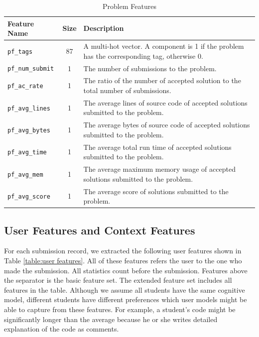         \begin{table}[hpbt]
        \begin{adjustwidth}{-1.5cm}{-1.5cm}
        \centering
        \begin{tabular}{lcp{12.5cm}}
            \hline
            Feature Name & Size & Description \\
            \hline
            {\footnotesize\verb|pf_tags|} & 87 &
                A multi-hot vector.\newline
                A component is 1 if the problem has the corresponding tag, otherwise 0. \\
            {\footnotesize\verb|pf_num_submit|} & 1 &
                The number of submissions to the problem. \\
            {\footnotesize\verb|pf_ac_rate|} & 1 &
                The ratio of the number of accepted solution to the total number of submissions. \\
            {\footnotesize\verb|pf_avg_lines|} & 1 &
                The average lines of source code of accepted solutions submitted to the problem. \\
            {\footnotesize\verb|pf_avg_bytes|} & 1 &
                The average bytes of source code of accepted solutions submitted to the problem. \\
            {\footnotesize\verb|pf_avg_time|} & 1 &
                The average total run time of accepted solutions submitted to the problem. \\
            {\footnotesize\verb|pf_avg_mem|} & 1 &
                The average maximum memory usage of accepted solutions submitted to the problem. \\
            {\footnotesize\verb|pf_avg_score|} & 1 &
                The average score of solutions submitted to the problem. \\
            \hline
        \end{tabular}
        \caption{Problem Features}
        \label{table:problem features}
        \end{adjustwidth}
        \end{table}

    \subsection{User Features and Context Features}

        For each submission record, we extracted the following user features shown in Table \ref{table:user features}.
        All of these features refers the user to the one who made the submission.
        All statistics count before the submission.
        Features above the separator is the basic feature set.
        The extended feature set includes all features in the table.
        Although we assume all students have the same cognitive model,
        different students have different preferences
        which user models might be able to capture from these features.
        For example, a student's code might be significantly longer than the average
        because he or she writes detailed explanation of the code as comments.

